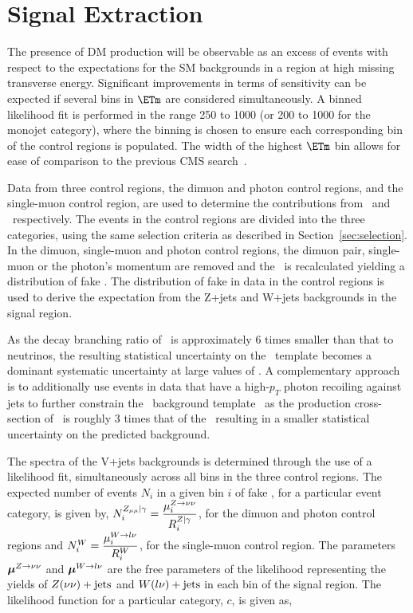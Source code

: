 \section{Signal Extraction}

The presence of DM production will be observable as an excess of events with respect to the expectations for the 
SM backgrounds in a region at high missing transverse energy. Significant improvements in terms of sensitivity can be expected if 
several bins in $\ETm$ are considered simultaneously. 
A binned likelihood fit is performed in the range 250 \gev to 1000 \gev (or 200 \gev to 1000 \gev 
for the monojet category), where the binning is chosen to ensure each corresponding bin of the control regions  
is populated. The width of the highest $\ETm$ bin allows for ease of comparison to the previous CMS search~\cite{monojet1}. 

Data from three control regions, the dimuon and photon control regions, and the single-muon control region, are used to determine the contributions from \Zvvjets~and 
\Wlvjets~respectively. The events in the control regions are divided into the three  categories, using the same selection criteria as 
described in Section~\ref{sec:selection}. In the dimuon, single-muon and photon control regions, the dimuon pair, single-muon or the photon's 
momentum are removed and the \ETm ~is recalculated yielding a distribution of fake \ETm. The distribution of fake \ETm 
in data in the control regions is used to derive the expectation from the Z+jets and W+jets backgrounds in the signal region.

As the decay branching ratio of \Zmm~is approximately 6 times smaller than that to neutrinos, the resulting statistical 
uncertainty on the \Zvvjets~template becomes a dominant systematic uncertainty at large values of \ETm.
A complementary approach is to additionally use events in data that have a high-$p_{T}$ 
photon recoiling against jets to further constrain the \Zvvjets~background template~\cite{CMS-PAS-SUS-08-002} as the production cross-section 
of \phojets~is roughly 3 times that of the \Zvvjets~resulting in a smaller statistical uncertainty on the predicted background. 
 
The \ETm spectra of the V+jets backgrounds is determined through the use of a likelihood fit, simultaneously across all bins 
in the three control regions. 
The expected number of events $N_{i}$ in a given bin $i$ of fake \ETm, for a particular event category, is given by, 
$N^{Z_{\mu\mu}|\gamma }_{i}=  \dfrac{{\mu^{Z\to\nu\nu}_{i}}}{R^{Z|\gamma}_{i}}$, 
for the dimuon and photon control regions and  $N^{W}_{i} =  \dfrac{{\mu^{W\to l\nu}_{i}}}{R^{W}_{i}}$,
for the single-muon control region. The parameters $\boldsymbol{\mu}^{Z\to\nu\nu}$ and $\boldsymbol{\mu}^{W\to l\nu}$ are the free parameters 
of the likelihood representing the yields of $Z(\nu\nu)+\textrm{jets}$ and $W(l\nu)+\textrm{jets}$ in each bin of the signal region. The likelihood function for a 
particular category, $c$, is given as,   

